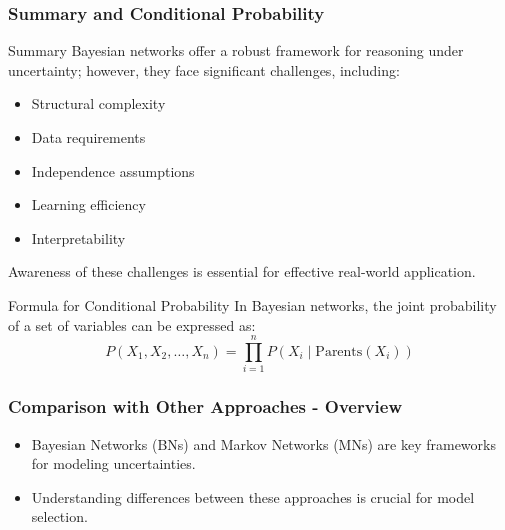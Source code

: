 \documentclass[aspectratio=169]{beamer}
\begin{document}
\begin{frame}[fragile]
    \frametitle{Summary and Conditional Probability}
    
    \begin{block}{Summary}
        Bayesian networks offer a robust framework for reasoning under uncertainty; however, they face significant challenges, including:
        \begin{itemize}
            \item Structural complexity
            \item Data requirements
            \item Independence assumptions
            \item Learning efficiency
            \item Interpretability
        \end{itemize}
        Awareness of these challenges is essential for effective real-world application.
    \end{block}
    
    \begin{block}{Formula for Conditional Probability}
        In Bayesian networks, the joint probability of a set of variables can be expressed as:
        \begin{equation}
            P(X_1, X_2, \ldots, X_n) = \prod_{i=1}^{n} P(X_i \mid \text{Parents}(X_i))
        \end{equation}
    \end{block}
\end{frame}

\begin{frame}[fragile]
    \frametitle{Comparison with Other Approaches - Overview}
    \begin{itemize}
        \item Bayesian Networks (BNs) and Markov Networks (MNs) are key frameworks for modeling uncertainties.
        \item Understanding differences between these approaches is crucial for model selection.
    \end{itemize}
\end{frame}
\end{document}
